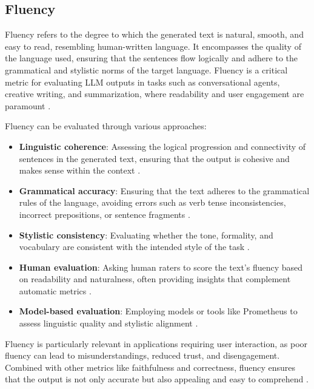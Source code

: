 \subsection{Fluency}

Fluency refers to the degree to which the generated text is natural, smooth, and easy to read, resembling human-written language. It encompasses the quality of the language used, ensuring that the sentences flow logically and adhere to the grammatical and stylistic norms of the target language. Fluency is a critical metric for evaluating LLM outputs in tasks such as conversational agents, creative writing, and summarization, where readability and user engagement are paramount \cite{yin2022sensitivitystabilitymodelinterpretations}.

Fluency can be evaluated through various approaches:
\begin{itemize}
    \item \textbf{Linguistic coherence}: Assessing the logical progression and connectivity of sentences in the generated text, ensuring that the output is cohesive and makes sense within the context \cite{gat2023faithfulexplanationsblackboxnlp}.
    \item \textbf{Grammatical accuracy}: Ensuring that the text adheres to the grammatical rules of the language, avoiding errors such as verb tense inconsistencies, incorrect prepositions, or sentence fragments \cite{varshney-etal-2022-towards}.
    \item \textbf{Stylistic consistency}: Evaluating whether the tone, formality, and vocabulary are consistent with the intended style of the task \cite{yao2023predictinggeneralizationperformancecorrectness}.
    \item \textbf{Human evaluation}: Asking human raters to score the text's fluency based on readability and naturalness, often providing insights that complement automatic metrics \cite{jacovi-goldberg-2020-towards}.
    \item \textbf{Model-based evaluation}: Employing models or tools like Prometheus to assess linguistic quality and stylistic alignment \cite{kim2024prometheus2opensource}.
\end{itemize}

Fluency is particularly relevant in applications requiring user interaction, as poor fluency can lead to misunderstandings, reduced trust, and disengagement. Combined with other metrics like faithfulness and correctness, fluency ensures that the output is not only accurate but also appealing and easy to comprehend \cite{jacovi-goldberg-2020-towards}.

